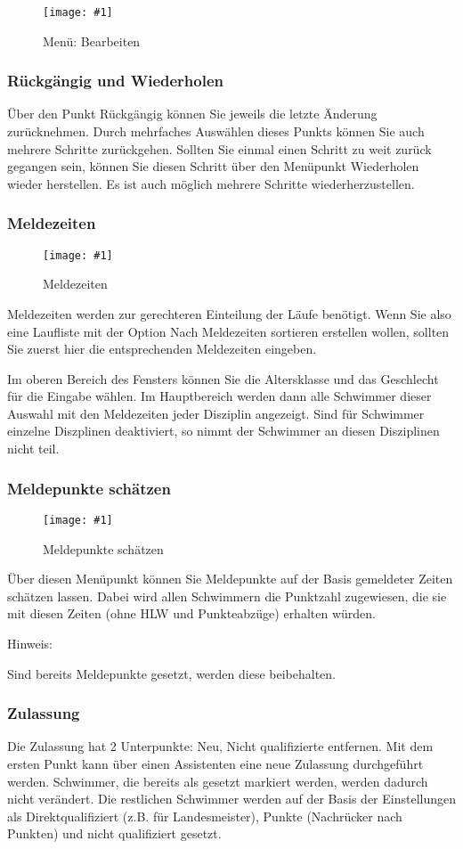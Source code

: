 \documentclass[11pt,a4paper,twoside,ngerman]{article}
\newcommand{\hsmimage}[3]{\begin{figure}[!ht]\centering\texttt{[image: \#1]}\caption{#3}\end{figure}}
\begin{document}
\hsmimage{pics/menu-bearbeiten}{.26\textwidth}{Menü: Bearbeiten}

\subsubsection*{Rückgängig und Wiederholen}
\label{lbl:jauswertungmenus:undo}Über den Punkt \glqq{}Rückgängig\grqq{} können Sie jeweils die letzte Änderung zurücknehmen. Durch mehrfaches Auswählen dieses Punkts können Sie auch mehrere Schritte zurückgehen. Sollten Sie einmal einen Schritt zu weit zurück gegangen sein, können Sie diesen Schritt über den Menüpunkt \glqq{}Wiederholen\grqq{} wieder herstellen. Es ist auch möglich mehrere Schritte wiederherzustellen.


\subsubsection*{Meldezeiten}

\hsmimage{pics/meldezeiten}{.80\textwidth}{Meldezeiten}
Meldezeiten werden zur gerechteren Einteilung der Läufe benötigt. Wenn Sie also eine Laufliste mit der Option \glqq{}Nach Meldezeiten sortieren\grqq{} erstellen wollen, sollten Sie zuerst hier die entsprechenden Meldezeiten eingeben. 

Im oberen Bereich des Fensters können Sie die Altersklasse und das Geschlecht für die Eingabe wählen. Im Hauptbereich werden dann alle Schwimmer dieser Auswahl mit den Meldezeiten jeder Disziplin angezeigt. Sind für Schwimmer einzelne Diszplinen deaktiviert, so nimmt der Schwimmer an diesen Disziplinen nicht teil.


\subsubsection*{Meldepunkte schätzen}

\hsmimage{pics/meldepunkte-schaetzen}{.20\textwidth}{Meldepunkte schätzen}
Über diesen Menüpunkt können Sie Meldepunkte auf der Basis gemeldeter Zeiten schätzen lassen. Dabei wird allen Schwimmern die Punktzahl zugewiesen, die sie mit diesen Zeiten (ohne HLW und Punkteabzüge) erhalten würden. 

\begin{bfseries}Hinweis:\end{bfseries} Sind bereits Meldepunkte gesetzt, werden diese beibehalten.


\subsubsection*{Zulassung}
Die Zulassung hat 2 Unterpunkte: Neu, Nicht qualifizierte entfernen. Mit dem ersten Punkt kann über einen Assistenten eine neue Zulassung durchgeführt werden. Schwimmer, die bereits als gesetzt markiert werden, werden dadurch nicht verändert. Die restlichen Schwimmer werden auf der Basis der Einstellungen als Direktqualifiziert (z.B. für Landesmeister), Punkte (Nachrücker nach Punkten) und nicht qualifiziert gesetzt. 
\end{document}
